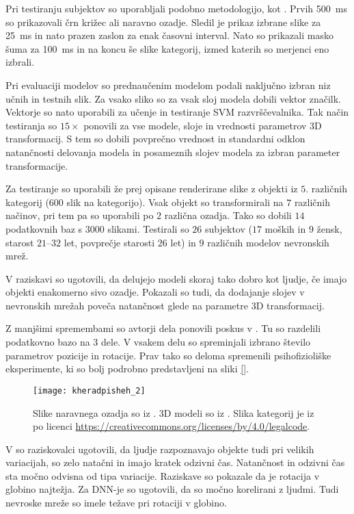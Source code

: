 Pri testiranju subjektov so uporabljali podobno metodologijo, kot \cite{geirhos2017comparing}. Prvih \SI{500}{\ms} so prikazovali črn križec ali naravno ozadje. Sledil je prikaz izbrane slike za \SI{25}{\ms} in nato prazen zaslon za enak časovni interval. Nato so prikazali masko šuma za \SI{100}{\ms} in na koncu še slike kategorij, izmed katerih so merjenci eno izbrali.  

Pri evaluaciji modelov so prednaučenim modelom podali naključno izbran niz učnih in testnih slik. Za vsako sliko so za vsak sloj modela dobili vektor značilk. Vektorje so nato uporabili za učenje in testiranje SVM razvrščevalnika. Tak način testiranja so $15\times$ ponovili za vse modele, sloje in vrednosti parametrov 3D transformacij. S tem so dobili povprečno vrednost in standardni odklon natančnosti delovanja modela in posameznih slojev modela za izbran parameter transformacije.

Za testiranje so uporabili že prej opisane renderirane slike z objekti iz $5$. različnih kategorij ($600$ slik na kategorijo). Vsak objekt so transformirali na $7$ različnih načinov, pri tem pa so uporabili po $2$ različna ozadja. Tako so dobili $14$ podatkovnih baz s $3000$ slikami. Testirali so $26$ subjektov ($17$ moških in $9$ žensk, starost $21$--$32$ let, povprečje starosti $26$ let) in $9$ različnih modelov nevronskih mrež.

V raziskavi so ugotovili, da delujejo modeli skoraj tako dobro kot ljudje, če imajo objekti enakomerno sivo ozadje. Pokazali so tudi, da dodajanje slojev v nevronskih mrežah poveča natančnost glede na parametre 3D transformacij. 

Z manjšimi spremembami so avtorji dela \cite{kheradpisheh2016deep} ponovili poskus v \cite{kheradpisheh2016humans}. Tu so razdelili podatkovno bazo na 3 dele. V vsakem delu so spreminjali izbrano število parametrov pozicije in rotacije. Prav tako so deloma spremenili psihofizioliške eksperimente, ki so bolj podrobno predstavljeni na sliki \ref{}. 

\begin{figure}[!htbp]
	\centering
	\texttt{[image: kheradpisheh\_2]}
	\caption{Slike naravnega ozadja so iz \cite{xiao2010sun}. 3D modeli so iz \cite{oreilly2013recurrent}. Slika kategorij je iz \cite{geirhos2017image} po licenci  \url{https://creativecommons.org/licenses/by/4.0/legalcode}.}
\end{figure}

V \cite{kheradpisheh2016humans} so raziskovalci ugotovili, da ljudje razpoznavajo objekte tudi pri velikih variacijah, so zelo natačni in imajo kratek odzivni čas. Natančnost in odzivni čas sta močno odvisna od tipa variacije. Raziskave so pokazale da je rotacija v globino najtežja. Za DNN-je so ugotovili, da so močno korelirani z ljudmi. Tudi nevroske mreže so imele težave pri rotaciji v globino. 



